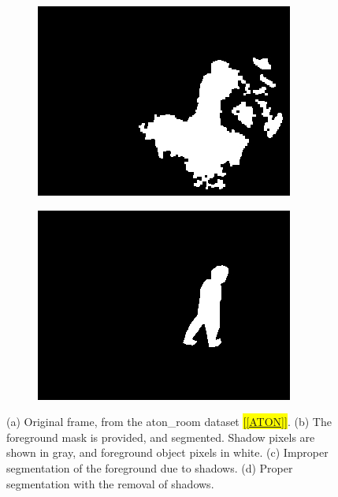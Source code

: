 \begin{figure}
\begin{subfigure}{.49\linewidth}
    \includegraphics[width=1\linewidth]{figures/background/room_0295_blob.jpg}
    \caption{}
  \end{subfigure}
  \hfill
  \begin{subfigure}{.49\linewidth}
  \centering
    \includegraphics[width=1\linewidth]{figures/background/room_0295_clean.jpg}
    \caption{}
  \end{subfigure}
  \caption{(a) Original frame, from the aton\_room dataset \hl{[\ref{ATON}]}. (b) The foreground mask is provided, and segmented. Shadow pixels are shown in gray, and foreground object pixels in white. (c) Improper segmentation of the foreground due to shadows. (d) Proper segmentation with the removal of shadows.}
\label{fig:nonshadow}
\end{figure}

